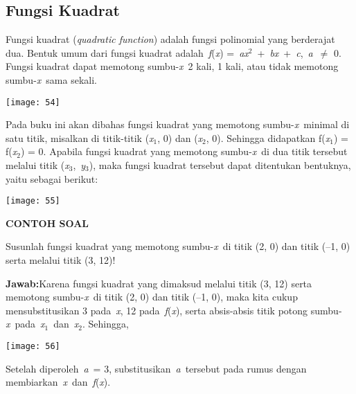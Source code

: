 \documentclass[11pt,fleqn]{book} %
\begin{document}
\begin{myEnumerate}
\begin{itemize}
\section{Fungsi Kuadrat}

\noindent Fungsi kuadrat (\textit{quadratic function}) adalah fungsi polinomial yang berderajat dua. Bentuk umum dari fungsi kuadrat adalah~\textit{f}(\textit{x}) =~\textit{ax}${}^{2}$~+~\textit{bx}~+~\textit{c},~\textit{a}~$\mathrm{\neq}$ 0. Fungsi kuadrat dapat memotong sumbu-\textit{x}~2 kali, 1 kali, atau tidak memotong sumbu-\textit{x}~sama sekali.

\begin{center}
\noindent \texttt{[image: 54]}
\end{center}

\noindent Pada buku ini akan dibahas fungsi kuadrat yang memotong sumbu-\textit{x}~minimal di satu titik, misalkan di titik-titik (\textit{x}${}_{1}$, 0) dan (\textit{x}${}_{2}$, 0). Sehingga didapatkan f(\textit{x}${}_{1}$) = f(\textit{x}${}_{2}$) = 0. Apabila fungsi kuadrat yang memotong sumbu-\textit{x}~di dua titik tersebut melalui titik (\textit{x}${}_{3}$,~\textit{y}${}_{3}$), maka fungsi kuadrat tersebut dapat ditentukan bentuknya, yaitu sebagai berikut:

\begin{center}
\noindent \texttt{[image: 55]}
\end{center}

\noindent \textbf{CONTOH SOAL}

\noindent Susunlah fungsi kuadrat yang memotong sumbu-\textit{x}~di titik (2, 0) dan titik (--1, 0) serta melalui titik (3, 12)!

\noindent \textbf{Jawab:}Karena fungsi kuadrat yang dimaksud melalui titik (3, 12) serta memotong sumbu-\textit{x}~di titik (2, 0) dan titik (--1, 0), maka kita cukup mensubstitusikan 3 pada~\textit{x}, 12 pada~\textit{f}(\textit{x}), serta absis-absis titik potong sumbu-\textit{x}~pada~\textit{x}${}_{1}$~dan~\textit{x}${}_{2}$. Sehingga,

\begin{center}
\noindent \texttt{[image: 56]}
\end{center}

\noindent Setelah diperoleh~\textit{a}~= 3, substitusikan~\textit{a}~tersebut pada rumus dengan membiarkan~\textit{x}~dan~\textit{f}(\textit{x}).


\end{itemize}
\end{myEnumerate}
\end{document}
